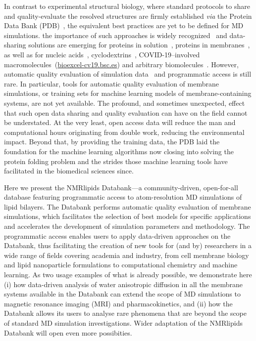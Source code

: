\documentclass[fleqn,10pt]{wlscirep}
\begin{document}
In contrast to experimental structural biology, where standard protocols to share and quality-evaluate the resolved structures are firmly established \textit{via} the Protein Data Bank (PDB)~\cite{montelione13}, the equivalent best practices are yet to be defined for MD simulations. the importance of such approaches is widely recognized~\cite{feig99,tai04,silva06,abraham19,hildebrand19,hospital20,abriata20,espigares20} and data-sharing solutions are emerging for proteins in solution~\cite{meyer10,kamp10}, proteins in membranes~\cite{newport19,espigares20,leston22}, as well as for nucleic acids~\cite{hospital16}, cyclodextrins~\cite{mixcoha16}, COVID-19--involved macromolecules~(\url{bioexcel-cv19.bsc.es}) and arbitrary biomolecules~\cite{bekker20}. However, automatic quality evaluation of simulation data~\cite{meyer10,hospital16} and programmatic access is still rare. In particular, tools for automatic quality evaluation of membrane simulations, or training sets for machine learning models of membrane-containing systems, are not yet available. The profound, and sometimes unexpected, effect that such open data sharing and quality evaluation can have on the field cannot be understated. At the very least, open access data will reduce the man and computational hours originating from double work, reducing the environmental impact. Beyond that, by providing the training data, the PDB laid the foundation for the machine learning algorithms now closing into solving the protein folding problem and the strides those machine learning tools have facilitated in the biomedical sciences since. 


Here we present the NMRlipids Databank---a community-driven, open-for-all database featuring programmatic access to atom-resolution MD simulations of lipid bilayers. The Databank performs automatic quality evaluation of membrane simulations, which facilitates the selection of best models for specific applications and accelerates the development of simulation parameters and methodology. The programmatic access enables users to apply data-driven approaches on the Databank, thus facilitating the creation of new tools for (and by) researchers in a wide range of fields covering academia and industry, from cell membrane biology and lipid nanoparticle formulations to computational chemistry and machine learning. As two usage examples of what is already possible, we demonstrate here (i) how data-driven analysis of water anisotropic diffusion in all the membrane systems available in the Databank can extend the scope of MD simulations to magnetic resonance imaging (MRI) and pharmacokinetics, and (ii) how the Databank allows its users to analyse rare phenomena that are beyond the scope of standard MD simulation investigations. Wider adaptation of the NMRlipids Databank will open even more possibities. 
\end{document}
